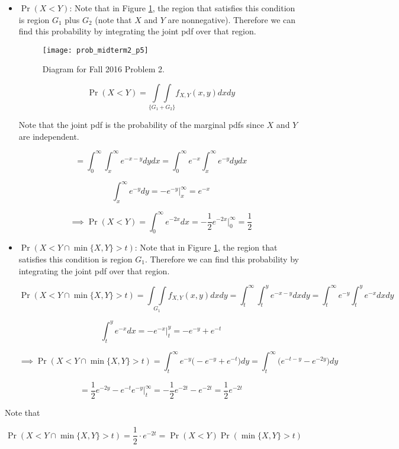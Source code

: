 \begin{enumerate}[(1)]
\begin{itemize}
\item \(\Pr(X < Y)\): Note that in Figure \ref{prob.fig.midterm2.p5}, the region that satisfies this condition is region \(G_1\) plus \(G_2\) (note that \(X\) and \(Y\) are nonnegative). Therefore we can find this probability by integrating the joint pdf over that region.

\begin{figure}\label{prob.fig.midterm2.p5}
  \caption{Diagram for Fall 2016 Problem 2.}
  \centering
    \texttt{[image: prob\_midterm2\_p5]}
\end{figure}

\[
\Pr(X < Y) = \underset{\{G_1 + G_2\}}{\int \int} f_{X,Y}(x,y) dx dy 
\]

Note that the joint pdf is the probability of the marginal pdfs since \(X\) and \(Y\) are independent.

\[
= \int_0^\infty \int_x^\infty e^{-x-y} dydx = \int_0^\infty e^{-x} \int_x^\infty e^{-y} dy dx 
\]

\[
 \int_x^\infty e^{-y} dy  = -e^{-y} \big|_x^\infty = e^{-x}
\]

\[
\implies \Pr(X < Y) = \int_0^\infty e^{-2x} dx = -\frac{1}{2} e^{-2x} \big|_0^\infty = \boxed{\frac{1}{2}}
\]



\item \(\Pr(X < Y \cap \min \{X, Y\} > t) \): Note that in Figure \ref{prob.fig.midterm2.p5}, the region that satisfies this condition is region \(G_1\). Therefore we can find this probability by integrating the joint pdf over that region.

\[
\Pr(X < Y \cap \min \{X, Y\} > t) = \underset{G_1}{\int \int} f_{X,Y}(x,y) dx dy = \int_t^\infty \int_t^y e^{-x-y} dxdy = \int_t^\infty e^{-y} \int_t^y e^{-x} dx dy
\]


\[
 \int_t^y e^{-x} dx = -e^{-x} \big|_t^y= -e^{-y} + e^{-t}
\]

\[
\implies \Pr(X < Y \cap \min \{X, Y\} > t) = \int_t^\infty e^{-y}\big(-e^{-y} + e^{-t} \big) dy =  \int_t^\infty \big( e^{-t-y} - e^{-2y}\big)dy
\]

\[
= \frac{1}{2}e^{-2y} -e^{-t}e^{-y} \big|_t^\infty = - \frac{1}{2}e^{-2t} - e^{-2t} = \boxed{\frac{1}{2}e^{-2t}}
\]

\end{itemize}

Note that

\[
\Pr(X < Y \cap \min \{X, Y\} > t)  = \frac{1}{2} \cdot e^{-2t} = \Pr(X < Y ) \Pr(\min \{X, Y\} > t)
\]


\end{enumerate}

